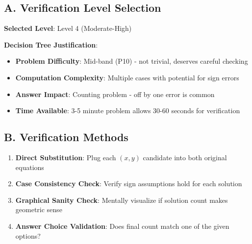 \documentclass[]{article}
\begin{document}
\begin{verificationbox}
\subsection*{A. Verification Level Selection}
\textbf{Selected Level}: Level 4 (Moderate-High)

\textbf{Decision Tree Justification}:
\begin{itemize}[leftmargin=*]
    \item \textbf{Problem Difficulty}: Mid-band (P10) - not trivial, deserves careful checking
    \item \textbf{Computation Complexity}: Multiple cases with potential for sign errors
    \item \textbf{Answer Impact}: Counting problem - off by one error is common
    \item \textbf{Time Available}: 3-5 minute problem allows 30-60 seconds for verification
\end{itemize}

\subsection*{B. Verification Methods}
\begin{enumerate}
    \item \textbf{Direct Substitution}: Plug each $(x,y)$ candidate into both original equations
    \item \textbf{Case Consistency Check}: Verify sign assumptions hold for each solution
    \item \textbf{Graphical Sanity Check}: Mentally visualize if solution count makes geometric sense
    \item \textbf{Answer Choice Validation}: Does final count match one of the given options?
\end{enumerate}


\end{verificationbox}
\end{document}
